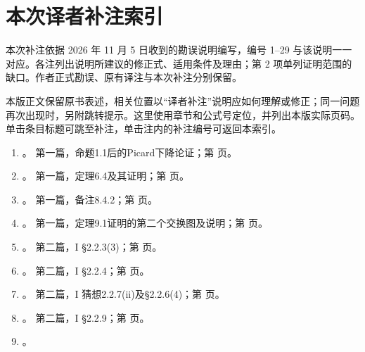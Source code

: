 \chapter*{本次译者补注索引}
本次补注依据 2026 年 11 月 5 日收到的勘误说明编写，编号 1--29 与该说明一一对应。各注列出说明所建议的修正式、适用条件及理由；第 2 项单列证明范围的缺口。作者正式勘误、原有译注与本次补注分别保留。

本版正文保留原书表述，相关位置以“译者补注”说明应如何理解或修正；同一问题再次出现时，另附跳转提示。这里使用章节和公式号定位，并列出本版实际页码。单击条目标题可跳至补注，单击注内的补注编号可返回本索引。

\begin{enumerate}[label=\arabic*.,leftmargin=2.5em,itemsep=7pt]
\item \hypertarget{translator-index-1}{}\hyperlink{translator-note-1}{}。
第一篇，命题1.1后的Picard下降论证；第\,\pageref*{translator-note:1}\,页。
\item \hypertarget{translator-index-2}{}\hyperlink{translator-note-2}{}。
第一篇，定理6.4及其证明；第\,\pageref*{translator-note:2}\,页。
\item \hypertarget{translator-index-3}{}\hyperlink{translator-note-3}{}。
第一篇，备注8.4.2；第\,\pageref*{translator-note:3}\,页。
\item \hypertarget{translator-index-4}{}\hyperlink{translator-note-4}{}。
第一篇，定理9.1证明的第二个交换图及说明；第\,\pageref*{translator-note:4}\,页。
\item \hypertarget{translator-index-5}{}\hyperlink{translator-note-5}{}。
第二篇，I §2.2.3(3)；第\,\pageref*{translator-note:5}\,页。
\item \hypertarget{translator-index-6}{}\hyperlink{translator-note-6}{}。
第二篇，I §2.2.4；第\,\pageref*{translator-note:6}\,页。
\item \hypertarget{translator-index-7}{}\hyperlink{translator-note-7}{}。
第二篇，I 猜想2.2.7(ii)及§2.2.6(4)；第\,\pageref*{translator-note:7}\,页。
\item \hypertarget{translator-index-8}{}\hyperlink{translator-note-8}{}。
第二篇，I §2.2.9；第\,\pageref*{translator-note:8}\,页。
\item \hypertarget{translator-index-9}{}\hyperlink{translator-note-9}{}。

\end{enumerate}
